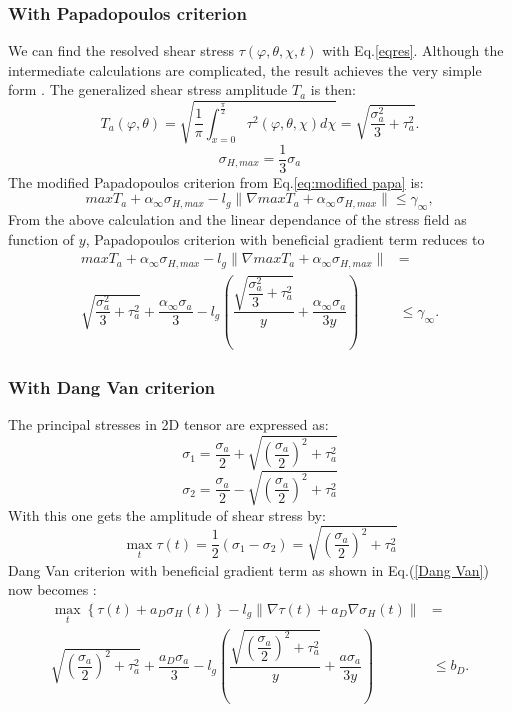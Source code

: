 \subsubsection{With Papadopoulos criterion}
We can find the resolved shear stress $\tau(\varphi,\theta,\chi ,t)$ with Eq.\eqref{eqres}. Although the intermediate calculations are complicated, the result achieves the very simple form \cite{Papadopoulos1997219}. The generalized shear stress amplitude $T_a$ is then:
$$T_a(\varphi,\theta)=\sqrt{\dfrac{1}{\pi}\int_{x=0}^{\frac{\pi}{2}} \tau^2(\varphi,\theta,\chi)d\chi}
=\sqrt{\dfrac{\sigma_a^2}{3}+\tau_a^2}.
$$
$$\sigma_{H,max}=\dfrac{1}{3}\sigma_a$$
The modified Papadopoulos criterion from Eq.\eqref{eq:modified papa} is:
$$maxT_a+\alpha_\infty\sigma_{H,max}-l_g\parallel\nabla{maxT_a}+\alpha_\infty\sigma_{H,max}\parallel\leqslant \gamma_\infty,$$
From the above calculation and the linear dependance of the stress field as function of $y$, 
Papadopoulos criterion with beneficial gradient term reduces to 
\begin{equation}
	\begin{split}
		maxT_a+\alpha_\infty\sigma_{H,max}-l_g\parallel\nabla{maxT_a}+\alpha_\infty\sigma_{H,max}\parallel&=\\\sqrt{\dfrac{\sigma_a^2}{3}+\tau_a^2}+\dfrac{\alpha_\infty\sigma_a}{3}-l_g\left( \dfrac{\sqrt{\dfrac{\sigma_a^2}{3}+\tau_a^2}}{y}+\dfrac{\alpha_\infty\sigma_a}{3y}\right) &\leqslant \gamma_\infty.
	\end{split}
	\label{modified Papadopoulos}
\end{equation}

\subsubsection{With Dang Van criterion}
The principal stresses in 2D tensor are expressed as:
$$\sigma_1=\dfrac{\sigma_a}{2}+\sqrt{\left( \dfrac{\sigma_a}{2}\right)^2+\tau_a^2 }$$
$$\sigma_2=\dfrac{\sigma_a}{2}-\sqrt{\left( \dfrac{\sigma_a}{2}\right)^2+\tau_a^2 }$$
With this one gets the amplitude of shear stress by:
$$\max\limits_{t}\tau(t)=\dfrac{1}{2}(\sigma_1-\sigma_2)=\sqrt{\left( \dfrac{\sigma_a}{2}\right)^2+\tau_a^2 }$$
Dang Van criterion with beneficial gradient term as shown in Eq.(\ref{Dang Van}) now becomes :
\begin{equation}
	\begin{split}
		\max\limits_{t}\left\{\tau{(t)}+a_D\sigma_H(t)\right\}-l_g\parallel{\nabla\tau{(t)}}+a_D\nabla\sigma_H(t)\parallel&=
		\\\sqrt{\left(\dfrac{\sigma_a}{2}\right)^2+\tau_a^2}+\dfrac{a_D\sigma_a}{3}-l_g\left( \dfrac{\sqrt{\left(\dfrac{\sigma_a}{2}\right)^2+\tau_a^2}}{y}+\dfrac{a\sigma_a}{3y}\right) &\leqslant b_D.
	\end{split}
	\label{Dang Van}
\end{equation}

